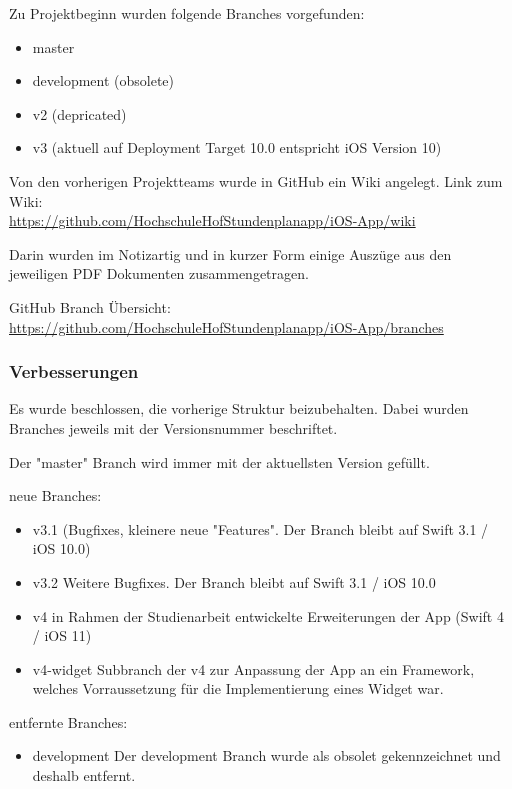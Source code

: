 Zu Projektbeginn wurden folgende Branches vorgefunden:
\begin{itemize}
\item master
\item development (obsolete)
\item v2 (depricated)
\item v3 (aktuell auf Deployment Target 10.0 entspricht iOS Version 10)
\end{itemize}


Von den vorherigen Projektteams wurde in GitHub ein Wiki angelegt.
Link zum Wiki:\\
\url{https://github.com/HochschuleHofStundenplanapp/iOS-App/wiki}

Darin wurden im Notizartig und in kurzer Form einige Auszüge aus den jeweiligen PDF Dokumenten zusammengetragen.




GitHub Branch Übersicht:\\
 \url{https://github.com/HochschuleHofStundenplanapp/iOS-App/branches}

\subsubsection{Verbesserungen}
Es wurde beschlossen, die vorherige Struktur beizubehalten. Dabei wurden Branches jeweils mit der Versionsnummer beschriftet.

Der "master" Branch wird immer mit der aktuellsten Version gefüllt.

neue Branches:
\begin{itemize}
\item v3.1 (Bugfixes, kleinere neue "Features". Der Branch bleibt auf Swift 3.1  / iOS 10.0)
\item v3.2 Weitere Bugfixes. Der Branch bleibt auf Swift 3.1  / iOS 10.0 %
\item v4 in Rahmen der Studienarbeit entwickelte Erweiterungen der App (Swift 4 / iOS 11)
\item v4-widget Subbranch der v4 zur Anpassung der App an ein Framework, welches Vorraussetzung für die Implementierung eines Widget war.
\end{itemize}

entfernte Branches:
\begin{itemize}
\item development Der development Branch wurde als obsolet gekennzeichnet und deshalb entfernt.
\end{itemize}

